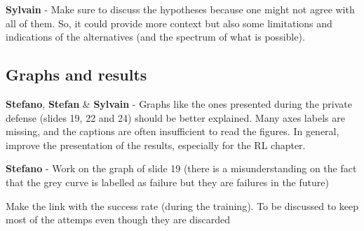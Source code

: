 \documentclass[12pt,a4paper]{article}
\begin{document}
\begin{mdframed}[style=manuscript] %

\end{mdframed}

\begin{mdframed}[style=comment] %
{\color{purple} \textbf{Sylvain}} - Make sure to discuss the hypotheses because one might not agree with all of them. So, it could provide more context but also some limitations and indications of the alternatives (and the spectrum of what is possible).
\end{mdframed}

\noindent

\begin{mdframed}[style=manuscript] %

\end{mdframed}



\subsection{Graphs and results}
\label{general_graphs_results}

\begin{mdframed}[style=comment] %
{\color{orange} \textbf{Stefano}}, {\color{teal} \textbf{Stefan}} \& {\color{purple} \textbf{Sylvain}} - Graphs like the ones presented during the private defense (slides 19, 22 and 24) should be better explained. Many axes labels are missing, and the captions are often insufficient to read the figures. In general, improve the presentation of the results, especially for the RL chapter.
\end{mdframed}

\noindent

\begin{mdframed}[style=manuscript] %

\end{mdframed}

\begin{mdframed}[style=comment] %
{\color{orange} \textbf{Stefano}} - Work on the graph of slide 19 (there is a misunderstanding on the fact that the grey curve is labelled as failure but they are failures in the future)
\end{mdframed}

\noindent Make the link with the success rate (during the training).  To be discussed to keep most of the attemps even though they are discarded
\end{document}
